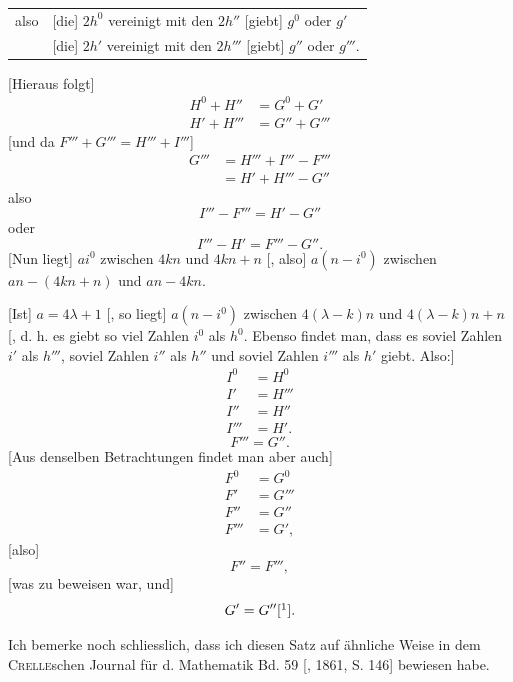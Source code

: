 \begin{center}\begin{tabular}{@{}rl@{}}
also & [die] \(2h^0\) vereinigt mit den \(2h''\) [giebt] \(g^0\) oder \(g'\)\\
& [die] \(2h'\) vereinigt mit den \(2h'''\) [giebt] \(g''\) oder \(g'''.\)
\end{tabular}\end{center}
\noindent\hspace*{\parindent}[Hieraus folgt]
\[
\begin{aligned}
H^0+H''&=G^0+G'\\
H'+H'''&=G''+G'''
\end{aligned}
\]
[und da \(F'''+G'''=H'''+I'''\)]
\[
\begin{aligned}
G'''&=H'''+I'''-F'''\\
&=H'+H'''-G''
\end{aligned}
\]
also
\[
I'''-F'''=H'-G''
\]
oder
\[
I'''-H'=F'''-G''.
\]
[Nun liegt] \(ai^0\) zwischen \(4kn\) und \(4kn+n\) [, also] \(a(n-i^0)\) zwischen \(an-(4kn+n)\) und \(an-4kn\).

[Ist] \(a=4\lambda+1\) [, so liegt] \(a(n-i^0)\) zwischen \(4(\lambda-k)n\) und \(4(\lambda-k)n+n\) [, d. h. es giebt so viel Zahlen \(i^0\) als \(h^0\). Ebenso findet man, dass es soviel Zahlen \(i'\) als \(h'''\), soviel Zahlen \(i''\) als \(h''\) und soviel Zahlen \(i'''\) als \(h'\) giebt. Also:]
\[
\begin{aligned}
I^0&=H^0\\
I'&=H'''\\
I''&=H''\\
I'''&=H'.
\end{aligned}
\]
\newpage{}
\[
F'''=G''.
\]
[Aus denselben Betrachtungen findet man aber auch]
\[
\begin{aligned}
F^0&=G^0\\
F'&=G'''\\
F''&=G''\\
F'''&=G',
\end{aligned}
\]
[also]
\[
F''=F''',
\]
[was zu beweisen war, und]
\[
G'=G''[\hbox{\footnotemark}].
\]
\begingroup\renewcommand{\thefootnote}{[*)}
\footnotetext{In dem Manuskripte steht] \(F'=F''',\ G'=G'''\).}
\endgroup

Ich bemerke noch schliesslich, dass ich diesen Satz auf ähnliche Weise in dem \textsc{Crelle}schen Journal für d. Mathematik Bd. 59 [, 1861, S. 146] bewiesen habe.

